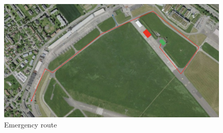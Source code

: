 \documentclass{article}
\begin{document}
\begin{figure}[h]
    \centering
    \includegraphics[width=\textwidth]{assets/emergency_route.png}
    \caption{Emergency route}
    \label{fig:emergency-route}
\end{figure}
\end{document}
